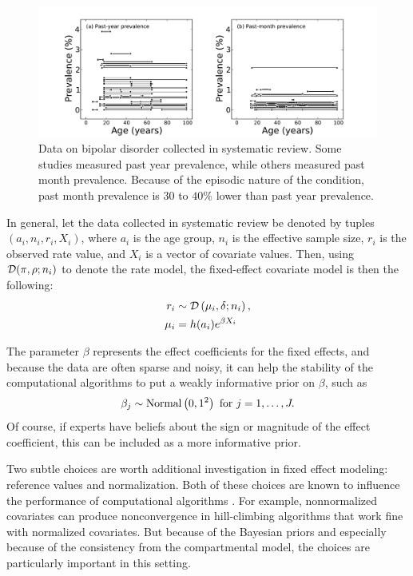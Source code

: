 \begin{figure}[h]
\begin{center}
\includegraphics[width=\textwidth]{bipolar-data-by-cv.pdf}
\caption{Data on bipolar disorder collected in systematic review.
  Some studies measured past year prevalence, while others measured
  past month prevalence.  Because of the episodic nature of the
  condition, past month prevalence is $30$ to $40\%$ lower than past
  year prevalence.}
\label{bipolar-data-cv}
\end{center}
\end{figure}


In general, let the data collected in systematic review be denoted by
tuples $\left(a_i, n_i, r_i, X_i\right)$, where $a_i$ is the age
group, $n_i$ is the effective sample size, $r_i$ is the observed rate
value, and $X_i$ is a vector of covariate values. Then, using
$\mathcal{D}(\pi, \rho; n_i)$ to denote the rate model, the fixed-effect
covariate model is then the following:
\begin{align*}
r_i &\sim \mathcal{D}\left(\mu_i, \delta; n_i\right),\\
\mu_i &= h(a_i)e^{\beta X_i}
\end{align*}

The parameter $\beta$ represents the effect coefficients for
the fixed effects, and because the data are often sparse and noisy, it
can help the stability of the computational algorithms to put a weakly
informative prior on $\beta$, such as
\[
\beta_j \sim \operatorname{Normal}\left(0, 1^2\right) \text{ for } j = 1, \ldots, J.
\]
Of course, if experts have beliefs about the sign or magnitude of the
effect coefficient, this can be included as a more informative prior.

Two subtle choices are worth additional investigation in fixed effect
modeling: reference values and normalization.  Both of these choices
are known to influence the performance of computational
algorithms \cite{gelman_bayesian_2003}. For example, nonnormalized covariates can produce
nonconvergence in hill-climbing algorithms that work fine with
normalized covariates.  But because of the Bayesian priors and
especially because of the consistency from the compartmental model,
the choices are particularly important in this setting.

